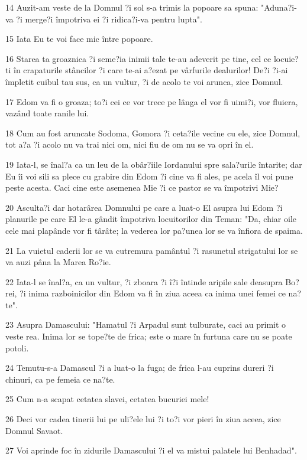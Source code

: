 \par 14 Auzit-am veste de la Domnul ?i sol s-a trimis la popoare sa spuna: "Aduna?i-va ?i merge?i împotriva ei ?i ridica?i-va pentru lupta".
\par 15 Iata Eu te voi face mic între popoare.
\par 16 Starea ta groaznica ?i seme?ia inimii tale te-au adeverit pe tine, cel ce locuie?ti în crapaturile stâncilor ?i care te-ai a?ezat pe vârfurile dealurilor! De?i ?i-ai împletit cuibul tau sus, ca un vultur, ?i de acolo te voi arunca, zice Domnul.
\par 17 Edom va fi o groaza; to?i cei ce vor trece pe lânga el vor fi uimi?i, vor fluiera, vazând toate ranile lui.
\par 18 Cum au fost aruncate Sodoma, Gomora ?i ceta?ile vecine cu ele, zice Domnul, tot a?a ?i acolo nu va trai nici om, nici fiu de om nu se va opri în el.
\par 19 Iata-l, se înal?a ca un leu de la obâr?iile Iordanului spre sala?urile întarite; dar Eu îi voi sili sa plece cu grabire din Edom ?i cine va fi ales, pe acela îl voi pune peste acesta. Caci cine este asemenea Mie ?i ce pastor se va împotrivi Mie?
\par 20 Asculta?i dar hotarârea Domnului pe care a luat-o El asupra lui Edom ?i planurile pe care El le-a gândit împotriva locuitorilor din Teman: "Da, chiar oile cele mai plapânde vor fi târâte; la vederea lor pa?unea lor se va înfiora de spaima.
\par 21 La vuietul caderii lor se va cutremura pamântul ?i rasunetul strigatului lor se va auzi pâna la Marea Ro?ie.
\par 22 Iata-l se înal?a, ca un vultur, ?i zboara ?i î?i întinde aripile sale deasupra Bo?rei, ?i inima razboinicilor din Edom va fi în ziua aceea ca inima unei femei ce na?te".
\par 23 Asupra Damascului: "Hamatul ?i Arpadul sunt tulburate, caci au primit o veste rea. Inima lor se tope?te de frica; este o mare în furtuna care nu se poate potoli.
\par 24 Temutu-s-a Damascul ?i a luat-o la fuga; de frica l-au cuprins dureri ?i chinuri, ca pe femeia ce na?te.
\par 25 Cum n-a scapat cetatea slavei, cetatea bucuriei mele!
\par 26 Deci vor cadea tinerii lui pe uli?ele lui ?i to?i vor pieri în ziua aceea, zice Domnul Savaot.
\par 27 Voi aprinde foc în zidurile Damascului ?i el va mistui palatele lui Benhadad".
